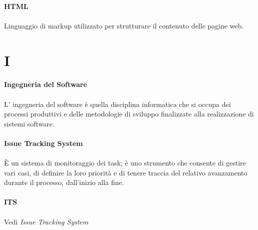 \documentclass[10pt, a4paper]{article}
\begin{document}
\paragraph{HTML}\noindent\hrulefill
\paragraph{}Linguaggio di markup utilizzato per strutturare il contenuto delle pagine web.


\newpage
\section{I}



\vspace{2em}
\paragraph{Ingegneria del Software}\noindent\hrulefill
\paragraph{}L' ingegneria del software è quella disciplina informatica che si occupa dei processi produttivi e delle metodologie di sviluppo finalizzate alla realizzazione di sistemi software.

\vspace{2em}
\paragraph{Issue Tracking System}\noindent\hrulefill
\paragraph{}È un sistema di monitoraggio dei task; è uno strumento che consente di gestire vari casi, di definire la loro priorità e di tenere traccia del relativo avanzamento durante il processo, dall'inizio alla fine. 

\vspace{2em}
\paragraph{ITS}\noindent\hrulefill
\paragraph{}Vedi \textit{Issue Tracking System\pg}
\end{document}
